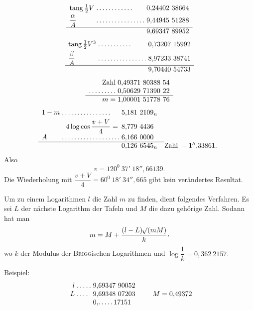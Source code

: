 \[
\begin{array}{l@{\;}l@{\;}l}
\mathrm{tang}\,\tfrac12V & .\,.\,.\,.\,.\,.\,.\,.\,.\,.\,.\,. & 0{,}24402\ 38664\\[3pt]
\dfrac{\alpha}{A} & .\,.\,.\,.\,.\,.\,.\,.\,.\,.\,.\,.\,.\,.\,.\,. & 9{,}44945\ 51288\\[3pt]\hline
&&9{,}69347\ 89952
\end{array}
\]
\[
\begin{array}{l@{\;}l@{\;}l}
\mathrm{tang}\,\tfrac12V^3 & .\,.\,.\,.\,.\,.\,.\,.\,.\,.\,. & 0{,}73207\ 15992\\[3pt]
\dfrac{\beta}{A} & .\,.\,.\,.\,.\,.\,.\,.\,.\,.\,.\,.\,.\,.\,.\,. & 8{,}97233\ 38741\\[3pt]\hline
&&9{,}70440\ 54733
\end{array}
\]
\[
\begin{array}{r@{\;}l}
\text{Zahl}&0{,}49371\ 80388\ 54\\
.\,.\,.\,.\,.\,.\,.\,.\,.&0{,}50629\ 71390\ 22\\\hline
m=&1{,}00001\ 51778\ 76
\end{array}
\]
\[
\begin{array}{l@{\;}l@{\;}l@{\quad}l}
1-m & .\,.\,.\,.\,.\,.\,.\,.\,.\,.\,.\,.\,.\,.\,.\,. &5{,}181\ 2109_n&\\[3pt]
\multicolumn{2}{r}{4\log\cos\dfrac{v+V}{4}=}&8{,}779\ 4436&\\[3pt]
A & .\,.\,.\,.\,.\,.\,.\,.\,.\,.\,.\,.\,.\,.\,.\,.\,.\,.\,.&6{,}166\ 0000&\\\cline{1-3}
&&0{,}126\ 6545_n&\text{Zahl }-1''{,}33861.
\end{array}
\]
Also
\[
v=120^0\ 37'\ 18''{,}66139.
\]
Die Wiederholung mit \(\dfrac{v+V}{4}=60^0\ 18'\ 34''{,}665\) gibt kein verändertes Resultat.
\par
\noindent\hspace*{\parindent}Um zu einem Logarithmen \(l\) die Zahl \(m\) zu finden, dient folgendes Verfahren. Es sei \(L\) der nächste Logarithm der Tafeln und \(M\) die dazu gehörige Zahl. Sodann hat man
\[
m=M+\frac{(l-L)\BareRoot{(mM)}}{k}\mathpunct{\text{\raisebox{.45ex}{,}}}
\]
wo \(k\) der Modulus der \textsc{Brigg}ischen Logarithmen und \(\log\dfrac1k=0{,}362\ 2157.\)
\par\nobreak
\noindent\hspace*{2\parindent}Beispiel:
\[
\begin{array}{r@{\;}l@{\;}l}
l&.\,.\,.\,.\,.&9{,}69347\ 90052\\
L&.\,.\,.\,.&9{,}69348\ 07203\\
&&0{,}.\,.\,.\,.\,.\,17151
\end{array}
\qquad M=0{,}49372
\]

